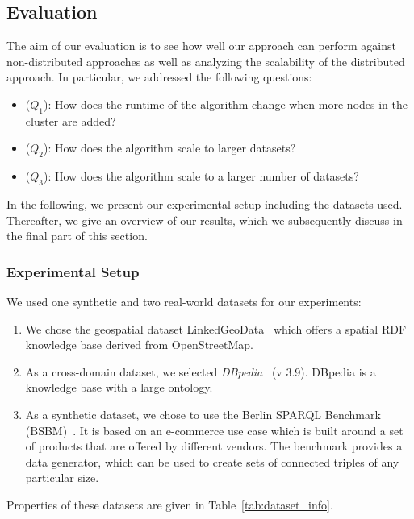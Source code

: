 \subsection{Evaluation}
\label{sec:evaluation}
The aim of our evaluation is to see how well our approach can perform against non-distributed approaches as well as analyzing the scalability of the distributed approach. 
In particular, we addressed the following questions:   
\begin{itemize}
    \item ($Q_1$): How does the runtime of the algorithm change when more nodes in the cluster are added?
    \item ($Q_2$): How does the algorithm scale to larger datasets?
    \item ($Q_3$): How does the algorithm scale to a larger number of datasets?
\end{itemize}

In the following, we present our experimental setup including the datasets used. Thereafter, we give an overview of our results, which we subsequently discuss in the final part of this section.

\subsubsection{Experimental Setup}
We used one synthetic and two real-world datasets for our experiments:
\begin{enumerate}
 
 \item We chose the geospatial dataset LinkedGeoData~\cite{SLHA11} which offers a spatial \gls{RDF} knowledge base derived from OpenStreetMap.
 
 \item As a cross-domain dataset, we selected \emph{DBpedia}~\cite{dbpedia-swj} (v 3.9). DBpedia is a knowledge base with a large ontology.
 
 \item As a synthetic dataset, we chose to use the Berlin \gls{SPARQL} Benchmark (BSBM)~\cite{Bizer2009TheBS}.
 It is based on an e-commerce use case which is built around a set of products that are offered by different vendors.
 The benchmark provides a data generator, which can be used to create sets of connected triples of any particular size.
 
\end{enumerate}

Properties of these datasets are given in Table~\ref{tab:dataset_info}.


